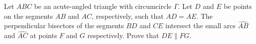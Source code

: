 Let $ABC$ be an acute-angled triangle with circumcircle $\Gamma$. Let $D$ and $E$ be points on the segments $AB$ and $AC$, respectively, such that $AD = AE$. The perpendicular bisectors of the segments $BD$ and $CE$ intersect the small arcs $\widehat{AB}$ and $\widehat{AC}$ at points $F$ and $G$ respectively. Prove that $DE \parallel FG$.

